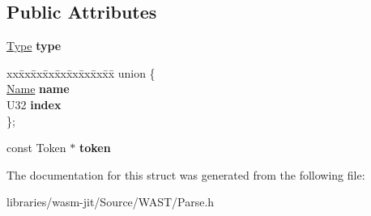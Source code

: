 \subsection*{Public Attributes}
\begin{DoxyCompactItemize}
\item 
\mbox{\label{struct_w_a_s_t_1_1_reference_acfd4670d22a4c21f5aa8918a0d14f599}} 
\mbox{\hyperlink{struct_type}{Type}} {\bfseries type}
\item 
\mbox{\label{struct_w_a_s_t_1_1_reference_afc66d56fd8c2bb36e0d9ed0eeb5b24fc}} 
\begin{tabbing}
xx\=xx\=xx\=xx\=xx\=xx\=xx\=xx\=xx\=\kill
union \{\\
\>\mbox{\hyperlink{struct_w_a_s_t_1_1_name}{Name}} {\bfseries name}\\
\>U32 {\bfseries index}\\
\}; \\

\end{tabbing}\item 
\mbox{\label{struct_w_a_s_t_1_1_reference_a98e8e176b1812f626d9e8e1d83a63486}} 
const Token $\ast$ {\bfseries token}
\end{DoxyCompactItemize}


The documentation for this struct was generated from the following file\+:\begin{DoxyCompactItemize}
\item 
libraries/wasm-\/jit/\+Source/\+W\+A\+S\+T/Parse.\+h\end{DoxyCompactItemize}
